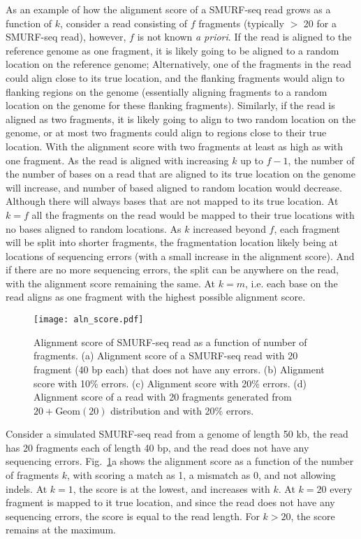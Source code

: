 As an example of how the alignment score of a SMURF-seq read grows as a
function of $k$, consider a read consisting of $f$ fragments (typically
$>$ 20 for a SMURF-seq read), however, $f$ is not known \emph{a priori}.
If the read is aligned to the reference genome as one fragment, it is
likely going to be aligned to a random location on the reference genome;
Alternatively, one of the fragments in the read could align close to its
true location, and the flanking fragments would align to flanking
regions on the genome (essentially aligning fragments to a random
location on the genome for these flanking fragments).
Similarly, if the read is aligned as two fragments, it is likely going
to align to two random location on the genome, or at most two fragments
could align to regions close to their true location. With the alignment
score with two fragments at least as high as with one fragment.
As the read is aligned with increasing $k$ up to $f-1$, the number of
the number of bases on a read that are aligned to its true location on
the genome will increase, and number of based aligned to random location
would decrease. Although there will always bases that are not mapped to
its true location.
At $k=f$ all the fragments on the read would be mapped to their true
locations with no bases aligned to random locations.
As $k$ increased beyond $f$, each fragment will be split into shorter
fragments, the fragmentation location likely being at locations of
sequencing errors (with a small increase in the alignment score). And if
there are no more sequencing errors, the split can be anywhere on the
read, with the alignment score remaining the same.
At $k=m$, i.e. each base on the read aligns as one fragment with the
highest possible alignment score.

\begin{figure}[t!]
\centering
\texttt{[image: aln\_score.pdf]}
\caption[Alignment score of SMURF-seq read as a function of number of
  fragments]{
  Alignment score of SMURF-seq read as a function of number of
  fragments.
  (a) Alignment score of a SMURF-seq read with 20 fragment (40 bp each)
  that does not have any errors.
  (b) Alignment score with 10\% errors.
  (c) Alignment score with 20\% errors.
  (d) Alignment score of a read with 20 fragments generated from $20 +
  \text{Geom}(20)$ distribution and with 20\% errors.}
\label{aln_score}
\end{figure}

Consider a simulated SMURF-seq read from a genome of length 50 kb, the
read has 20 fragments each of length 40 bp, and the read does not have
any sequencing errors. Fig.~\ref{aln_score}a shows the alignment score
as a function of the number of fragments $k$, with scoring a match as
1, a mismatch as 0, and not allowing indels. At $k=1$, the score is at
the lowest, and increases with $k$. At $k=20$ every fragment is mapped
to it true location, and since the read does not have any sequencing
errors, the score is equal to the read length. For $k > 20$, the score
remains at the maximum.

